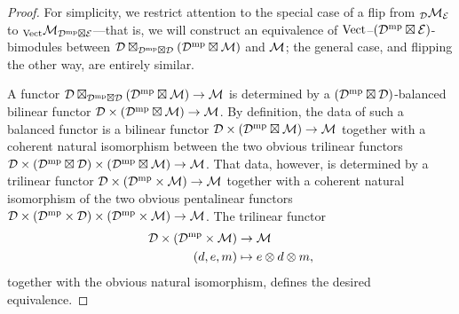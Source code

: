 \documentclass{amsart}
\begin{document}
\begin{proof}
For simplicity, we restrict attention to the special case of a flip from ${}_\mathcal D \mathcal M_\mathcal E$ to ${}_{\mathrm{Vect}} \mathcal M_{\mathcal D^{\mathrm{mp}} \boxtimes \mathcal E}$---that is, we will construct an equivalence of $\mathrm{Vect}$--$(\mathcal D^{\mathrm{mp}} \boxtimes \mathcal E)$-bimodules between $\mathcal D \boxtimes_{\mathcal D^{\mathrm{mp}} \boxtimes \mathcal D} (\mathcal D^{\mathrm{mp}} \boxtimes \mathcal M)$ and $\mathcal M$; the general case, and flipping the other way, are entirely similar.  

A functor $\mathcal D \boxtimes_{\mathcal D^{\mathrm{mp}} \boxtimes \mathcal D} (\mathcal D^{\mathrm{mp}} \boxtimes \mathcal M) \rightarrow \mathcal M$ is determined by a $(\mathcal D^{\mathrm{mp}} \boxtimes \mathcal D)$-balanced bilinear functor $\mathcal D \times (\mathcal D^{\mathrm{mp}} \boxtimes \mathcal M) \rightarrow \mathcal M$.  By definition, the data of such a balanced functor is a bilinear functor $\mathcal D \times (\mathcal D^{\mathrm{mp}} \boxtimes \mathcal M) \rightarrow \mathcal M$ together with a coherent natural isomorphism between the two obvious trilinear functors $\mathcal D \times (\mathcal D^{\mathrm{mp}} \boxtimes \mathcal D) \times (\mathcal D^{\mathrm{mp}} \boxtimes \mathcal M) \rightarrow \mathcal M$.  That data, however, is determined by a trilinear functor $\mathcal D \times (\mathcal D^{\mathrm{mp}} \times \mathcal M) \rightarrow \mathcal M$ together with a coherent natural isomorphism of the two obvious pentalinear functors $\mathcal D \times (\mathcal D^{\mathrm{mp}} \times \mathcal D) \times (\mathcal D^{\mathrm{mp}} \times \mathcal M) \rightarrow \mathcal M$.  The trilinear functor
\begin{align*}
\mathcal D \times (\mathcal D^{\mathrm{mp}} \times \mathcal M) & \rightarrow \mathcal M \\
(d,e,m) & \mapsto e \otimes d \otimes m,
\end{align*}
together with the obvious natural isomorphism, defines the desired equivalence.
\end{proof}
\end{document}
